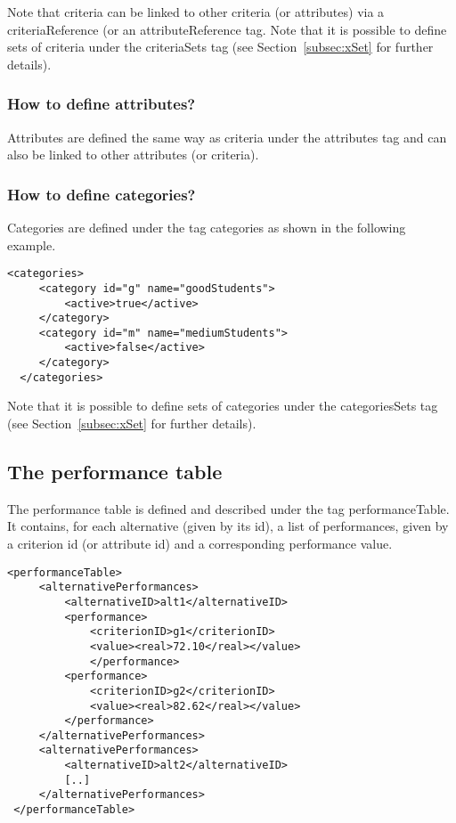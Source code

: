 \documentclass[a4paper,oneside,10 pt]{article}
\newcommand{\code}{\asciifamily}
\begin{document}
Note that criteria can be linked to other criteria (or attributes) via a {\code criteriaReference} (or an {\code attributeReference} tag. Note that it is possible to define sets of criteria under the {\code criteriaSets} tag (see Section~\ref{subsec:xSet} for further details).

\subsubsection{How to define attributes?}

Attributes are defined the same way as criteria under the {\code attributes} tag and can also be linked to other attributes (or criteria). 

\subsubsection{How to define categories?}

Categories are defined under the tag {\code categories} as shown in the following example. 
{\code
\begin{lstlisting}[style=prototype]
 <categories>
	 <category id="g" name="goodStudents">
		 <active>true</active>
	 </category>
	 <category id="m" name="mediumStudents">
		 <active>false</active>
	 </category>
  </categories>
\end{lstlisting}
}

Note that it is possible to define sets of categories under the {\code categoriesSets} tag (see Section~\ref{subsec:xSet} for further details).




\subsection{The performance table}

The performance table is defined and described under the tag {\code performanceTable}. It contains, for each alternative (given by its id), a list of performances, given by a criterion id (or attribute id) and a corresponding performance value. 

{\code
\begin{lstlisting}[style=prototype]
 <performanceTable>
	 <alternativePerformances>
		 <alternativeID>alt1</alternativeID>
		 <performance>
			 <criterionID>g1</criterionID>
			 <value><real>72.10</real></value>
			 </performance>
		 <performance>
			 <criterionID>g2</criterionID>
			 <value><real>82.62</real></value>
		 </performance>
	 </alternativePerformances>
	 <alternativePerformances>
		 <alternativeID>alt2</alternativeID>
		 [..]
	 </alternativePerformances>
 </performanceTable>
\end{lstlisting}
}
\end{document}
